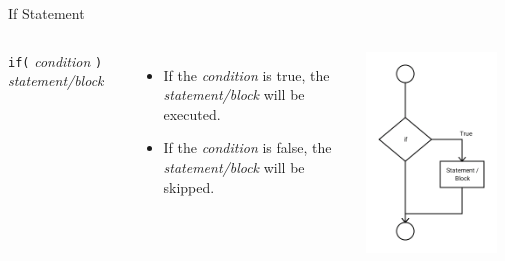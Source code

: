 \documentclass[]{beamer}
\begin{document}
\begin{frame}[fragile]{If Statement}
\begin{columns}
    \verb!if(! \textit{condition} \verb!)! 
    \verb!    ! \textit{statement/block}

    \vspace{2cm}

    \begin{itemize}[<+(1)->]
        \item If the \textit{condition} is true, the
            \textit{statement/block} will be executed.
        \item If the \textit{condition} is false, the 
            \textit{statement/block} will be skipped.
    \end{itemize}

    \includegraphics[width=0.9\textwidth]{images/if}
\end{columns}
\end{frame}
\end{document}
